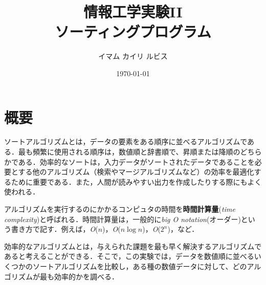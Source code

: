 \documentclass[a4j, titlepage]{jarticle}
\title{情報工学実験II\\ソーティングプログラム}
\author{イマム カイリ ルビス}
\date{\today}
\begin{document}
\maketitle

\tableofcontents
\clearpage

\section{概要}

ソートアルゴリズムとは，データの要素をある順序に並べるアルゴリズムである．最も頻繁に使用される順序は，数値順と辞書順で、昇順または降順のどちらかである．効率的なソートは，入力データがソートされたデータであることを必要とする他のアルゴリズム（検索やマージアルゴリズムなど）の効率を最適化するために重要である．また，人間が読みやすい出力を作成したりする際にもよく使われる．

アルゴリズムを実行するのにかかるコンピュタの時間を\textbf{時間計算量}(\textit{time complexity})と呼ばれる．時間計算量は，一般的に\textit{big O notation}(オーダー)という書き方で記す．例えば，\textit{O}($n$)，\textit{O}($n \log n$)，\textit{O}($2^n$)，など．


効率的なアルゴリズムとは，与えられた課題を最も早く解決するアルゴリズムであると考えることができる．そこで，この実験では，データを数値順に並べるいくつかのソートアルゴリズムを比較し，ある種の数値データに対して、どのアルゴリズムが最も効率的かを調べる．
\end{document}
